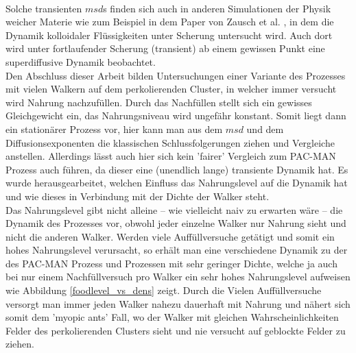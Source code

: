\documentclass[a4paper, 12pt]{report}
\begin{document}
\\
Solche transienten $msd$s finden sich auch in anderen Simulationen der Physik weicher Materie wie zum Beispiel in dem Paper von Zausch et al. \cite{Zausch_2008}, in dem die Dynamik kolloidaler Flüssigkeiten unter Scherung untersucht wird. Auch dort wird unter fortlaufender Scherung (transient) ab einem gewissen Punkt eine superdiffusive Dynamik beobachtet.
\\
Den Abschluss dieser Arbeit bilden Untersuchungen einer Variante des Prozesses mit vielen Walkern auf dem perkolierenden Cluster, in welcher immer versucht wird Nahrung nachzufüllen. Durch das Nachfüllen stellt sich ein gewisses Gleichgewicht ein, das Nahrungsniveau wird ungefähr konstant. Somit liegt dann ein stationärer Prozess vor, hier kann man aus dem $msd$ und dem Diffusionsexponenten die klassischen Schlussfolgerungen ziehen und Vergleiche anstellen. Allerdings lässt auch hier sich kein 'fairer' Vergleich zum PAC-MAN Prozess auch \cite{doi:10.1063/1.4999485} führen, da dieser eine (unendlich lange) transiente Dynamik hat. Es wurde herausgearbeitet, welchen Einfluss das Nahrungslevel auf die Dynamik hat und wie dieses in Verbindung mit der Dichte der Walker steht.
\\
Das Nahrungslevel gibt nicht alleine -- wie vielleicht naiv zu erwarten wäre -- die Dynamik des Prozesses vor, obwohl jeder einzelne Walker nur Nahrung sieht und nicht die anderen Walker. Werden viele Auffüllversuche getätigt und somit ein hohes Nahrungslevel verursacht, so erhält man eine verschiedene Dynamik zu der des PAC-MAN Prozess und Prozessen mit sehr geringer Dichte, welche ja auch bei nur einem Nachfüllversuch pro Walker ein sehr hohes Nahrungslevel aufweisen wie Abbildung \ref{foodlevel_vs_dens} zeigt. Durch die Vielen Auffüllversuche versorgt man immer jeden Walker nahezu dauerhaft mit Nahrung und nähert sich somit dem 'myopic ants' Fall, wo der Walker mit gleichen Wahrscheinlichkeiten Felder des perkolierenden Clusters sieht und nie versucht auf geblockte Felder zu ziehen.

\newpage
\end{document}
